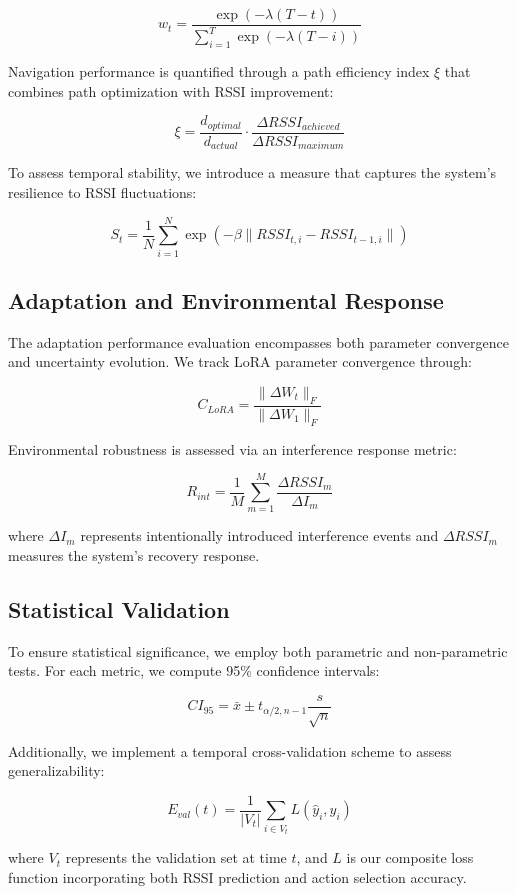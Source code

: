 \documentclass[12pt]{article}
\begin{document}
\[
    w_t = \frac{\exp(-\lambda(T-t))}{\sum_{i=1}^T \exp(-\lambda(T-i))}
\]

Navigation performance is quantified through a path efficiency index \( \xi \) that combines path optimization with RSSI improvement:

\[
    \xi = \frac{d_{optimal}}{d_{actual}} \cdot \frac{\Delta RSSI_{achieved}}{\Delta RSSI_{maximum}}
\]

To assess temporal stability, we introduce a measure that captures the system's resilience to RSSI fluctuations:

\[
    S_t = \frac{1}{N}\sum_{i=1}^N \exp(-\beta\|RSSI_{t,i} - RSSI_{t-1,i}\|)
\]

\subsection{Adaptation and Environmental Response}

The adaptation performance evaluation encompasses both parameter convergence and uncertainty evolution. We track LoRA parameter convergence through:

\[
    C_{LoRA} = \frac{\|\Delta W_t\|_F}{\|\Delta W_1\|_F}
\]

Environmental robustness is assessed via an interference response metric:

\[
    R_{int} = \frac{1}{M}\sum_{m=1}^M \frac{\Delta RSSI_m}{\Delta I_m}
\]

where \( \Delta I_m \) represents intentionally introduced interference events and \( \Delta RSSI_m \) measures the system's recovery response.

\subsection{Statistical Validation}

To ensure statistical significance, we employ both parametric and non-parametric tests. For each metric, we compute 95\% confidence intervals:

\[
    CI_{95} = \bar{x} \pm t_{\alpha/2,n-1}\frac{s}{\sqrt{n}}
\]

Additionally, we implement a temporal cross-validation scheme to assess generalizability:

\[
    E_{val}(t) = \frac{1}{|V_t|}\sum_{i\in V_t} L(\hat{y}_i, y_i)
\]

where \( V_t \) represents the validation set at time \( t \), and \( L \) is our composite loss function incorporating both RSSI prediction and action selection accuracy.
\end{document}
